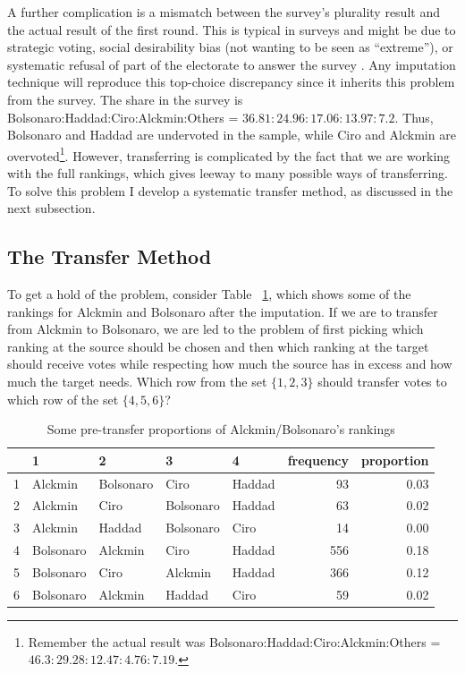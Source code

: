 \documentclass[hidelinks,11pt]{article} \usepackage[utf8]{inputenc}
\begin{document}
A further complication is a mismatch between the survey's plurality result and
the actual result of the first round. This is typical in surveys and might be
due to strategic voting, social desirability bias (not wanting to be seen as
``extreme''), or systematic refusal of part of the electorate to answer the
survey \parencite{nishimura2016alternative}. Any imputation technique will
reproduce this top-choice discrepancy since it inherits this problem from the
survey. The share in the survey is Bolsonaro:Haddad:Ciro:Alckmin:Others =
\(36.81 : 24.96 : 17.06: 13.97 : 7.2 \). Thus, Bolsonaro and Haddad are
undervoted in the sample, while Ciro and Alckmin are overvoted\footnote{Remember
the actual result was Bolsonaro:Haddad:Ciro:Alckmin:Others =
\(46.3 : 29.28 : 12.47 : 4.76 : 7.19 \).}. However, transferring is complicated
by the fact that we are working with the full rankings, which gives leeway to
many possible ways of transferring. To solve this problem I develop a systematic transfer method, as discussed in the next subsection.

\subsection{The Transfer Method}
To get a hold of the problem,  consider Table
~\ref{tbl:overunderex}, which shows some of the rankings for Alckmin and
Bolsonaro after the imputation. If we are to transfer from Alckmin to Bolsonaro,
we are led to the problem of first picking which ranking at the source should be
chosen and then which ranking at the target should receive votes while
respecting how much the source has in excess and how much the target needs.
Which row from the set \(\{1,2,3\}\) should transfer votes to which row of the
set \(\{4,5,6\}\)?

\begin{table}[!h] \centering %
\begin{tabular}{rllllrr} \hline & 1 & 2 & 3 & 4 & frequency & proportion \\
\hline 1 & Alckmin & Bolsonaro & Ciro & Haddad & 93 & 0.03 \\ 2 & Alckmin & Ciro
& Bolsonaro & Haddad & 63 & 0.02 \\ 3 & Alckmin & Haddad & Bolsonaro & Ciro & 14
& 0.00 \\ 4 & Bolsonaro & Alckmin & Ciro & Haddad & 556 & 0.18 \\ 5 & Bolsonaro
& Ciro & Alckmin & Haddad & 366 & 0.12 \\ 6 & Bolsonaro & Alckmin & Haddad &
Ciro & 59 & 0.02 \\ \hline
\end{tabular} %
\caption{Some pre-transfer proportions of Alckmin/Bolsonaro's rankings}
\label{tbl:overunderex}
\end{table}
\end{document}
